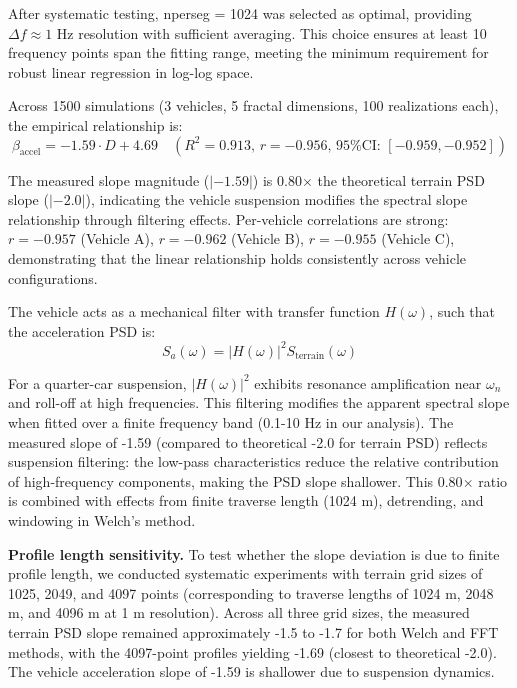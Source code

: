 \documentclass[11pt]{article}
\begin{document}
After systematic testing, nperseg = 1024 was selected as optimal, providing $\Delta f \approx 1$ Hz resolution with sufficient averaging. This choice ensures at least 10 frequency points span the fitting range, meeting the minimum requirement for robust linear regression in log-log space.

Across 1500 simulations (3 vehicles, 5 fractal dimensions, 100 realizations each), the empirical relationship is:
\begin{equation}
\beta_{\text{accel}} = -1.59 \cdot D + 4.69 \quad (R^2 = 0.913, \, r = -0.956, \, \text{95\% CI: } [-0.959, -0.952])
\end{equation}

The measured slope magnitude ($|-1.59|$) is 0.80$\times$ the theoretical terrain PSD slope ($|-2.0|$), indicating the vehicle suspension modifies the spectral slope relationship through filtering effects. Per-vehicle correlations are strong: $r = -0.957$ (Vehicle A), $r = -0.962$ (Vehicle B), $r = -0.955$ (Vehicle C), demonstrating that the linear relationship holds consistently across vehicle configurations.

The vehicle acts as a mechanical filter with transfer function $H(\omega)$, such that the acceleration PSD is:
\begin{equation}
S_a(\omega) = |H(\omega)|^2 S_{\text{terrain}}(\omega)
\end{equation}

For a quarter-car suspension, $|H(\omega)|^2$ exhibits resonance amplification near $\omega_n$ and roll-off at high frequencies. This filtering modifies the apparent spectral slope when fitted over a finite frequency band (0.1-10 Hz in our analysis). The measured slope of -1.59 (compared to theoretical -2.0 for terrain PSD) reflects suspension filtering: the low-pass characteristics reduce the relative contribution of high-frequency components, making the PSD slope shallower. This 0.80$\times$ ratio is combined with effects from finite traverse length (1024 m), detrending, and windowing in Welch's method.

\textbf{Profile length sensitivity.} To test whether the slope deviation is due to finite profile length, we conducted systematic experiments with terrain grid sizes of 1025, 2049, and 4097 points (corresponding to traverse lengths of 1024 m, 2048 m, and 4096 m at 1 m resolution). Across all three grid sizes, the measured terrain PSD slope remained approximately -1.5 to -1.7 for both Welch and FFT methods, with the 4097-point profiles yielding -1.69 (closest to theoretical -2.0). The vehicle acceleration slope of -1.59 is shallower due to suspension dynamics. 
\end{document}

